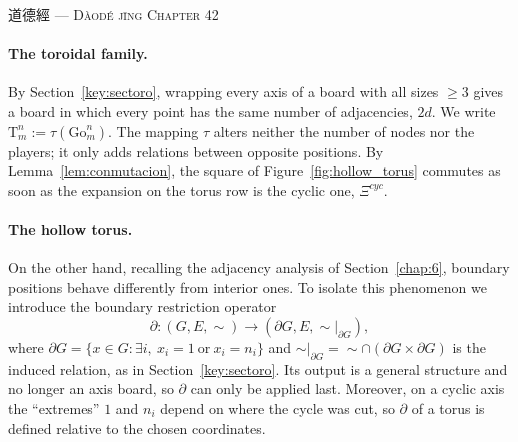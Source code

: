 \vspace{1pt}
\hfill  道德經 — {\textsc{Dàodé jīng Chapter 42}}\\

\paragraph{The toroidal family.} By Section~\ref{key:sectoro}, wrapping every axis of a board with all sizes $\ge3$ gives a board in which every point has the same number of adjacencies, $2d$. We write $\mathrm{T}^n_m:=\tau(\mathrm{Go}^n_m)$. The mapping $\tau$ alters neither the number of nodes nor the players; it only adds relations between opposite positions. By Lemma~\ref{lem:conmutacion}, the square of Figure~\ref{fig:hollow_torus} commutes as soon as the expansion on the torus row is the cyclic one, $\Xi^{cyc}$.

\paragraph{The hollow torus.} On the other hand, recalling the adjacency analysis of Section~\ref{chap:6}, boundary positions behave differently from interior ones. To isolate this phenomenon we introduce the boundary restriction operator
$$\partial:(G,E,\sim)\to(\partial G,E,\sim|_{\partial G}),$$
where $\partial G=\{x\in G:\exists i,\ x_i=1\ \text{or}\ x_i=n_i\}$ and $\sim|_{\partial G}=\sim\cap(\partial G\times\partial G)$ is the induced relation, as in Section~\ref{key:sectoro}. Its output is a general structure and no longer an axis board, so $\partial$ can only be applied last. Moreover, on a cyclic axis the ``extremes'' $1$ and $n_i$ depend on where the cycle was cut, so $\partial$ of a torus is defined relative to the chosen coordinates.

